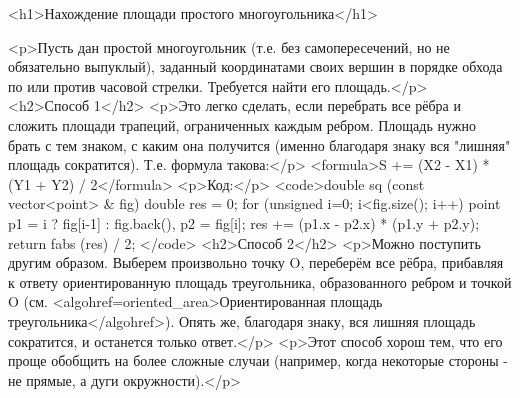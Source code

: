 <h1>Нахождение площади простого многоугольника</h1>

<p>Пусть дан простой многоугольник (т.е. без самопересечений, но не обязательно выпуклый), заданный координатами своих вершин в порядке обхода по или против часовой стрелки. Требуется найти его площадь.</p>
<h2>Способ 1</h2>
<p>Это легко сделать, если перебрать все рёбра и сложить площади трапеций, ограниченных каждым ребром. Площадь нужно брать с тем знаком, с каким она получится (именно благодаря знаку вся "лишняя" площадь сократится). Т.е. формула такова:</p>
<formula>S += (X2 - X1) * (Y1 + Y2) / 2</formula>
<p>Код:</p>
<code>double sq (const vector<point> & fig)
{
	double res = 0;
	for (unsigned i=0; i<fig.size(); i++)
	{
		point
			p1 = i ? fig[i-1] : fig.back(),
			p2 = fig[i];
		res += (p1.x - p2.x) * (p1.y + p2.y);
	}
	return fabs (res) / 2;
}</code>
<h2>Способ 2</h2>
<p>Можно поступить другим образом. Выберем произвольно точку O, переберём все рёбра, прибавляя к ответу ориентированную площадь треугольника, образованного ребром и точкой O (см. <algohref=oriented_area>Ориентированная площадь треугольника</algohref>). Опять же, благодаря знаку, вся лишняя площадь сократится, и останется только ответ.</p>
<p>Этот способ хорош тем, что его проще обобщить на более сложные случаи (например, когда некоторые стороны - не прямые, а дуги окружности).</p>